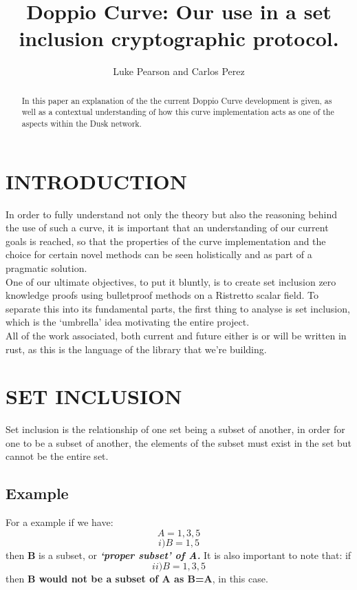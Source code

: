 \documentclass[letterpaper, 10 pt, conference]{ieeeconf}  %
\title{\LARGE \bf
Doppio Curve: Our use in a set inclusion cryptographic protocol.
}
\author{Luke Pearson and Carlos Perez}
\begin{document}
\maketitle
\thispagestyle{empty}
\pagestyle{empty}


\begin{abstract}

In this paper an explanation of the the current Doppio Curve development is given, as well as a contextual understanding of how this curve implementation acts as one of the aspects within the Dusk network.

\end{abstract}


\section{INTRODUCTION}

In order to fully understand not only the theory but also the reasoning behind the use of such a curve, it is important that an understanding of our current goals is reached, so that the properties of the curve implementation and the choice for certain novel methods can be seen holistically and as part of a pragmatic solution. \\
One of our ultimate objectives, to put it bluntly, is to create set inclusion zero knowledge proofs using bulletproof methods on a Ristretto scalar field. To separate this into its fundamental parts, the first thing to analyse is set inclusion, which is the ‘umbrella’ idea motivating the entire project. \\ 
All of the work associated, both current and future either is or will be written in rust, as this is the language of the library that we’re building. 

\section{SET INCLUSION}

Set inclusion is the relationship of one set being a subset of another, in order for one to be a subset of another, the elements of the subset must exist in the set but cannot be the entire set. 
\subsection{Example}
For a example if we have:  $$ A={1,3,5} $$
$$ i) B={1,5} $$ then \textbf{B} is a subset, or \textbf{\textit{‘proper subset’ of A.}} 
It is also important to note that: if $$ ii) B={1,3,5} $$ then \textbf{B would not be a subset of A as B=A}, in this case. 
\end{document}
